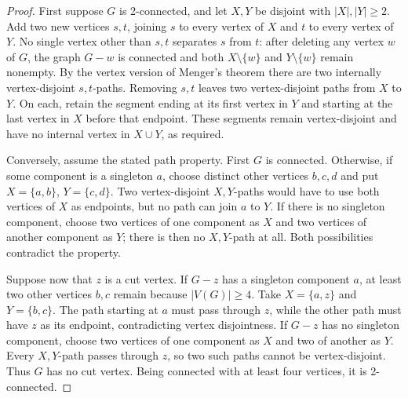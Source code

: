 \documentclass[12pt]{amsart}
\theoremstyle{conjecture}
\theoremstyle{definition}
\theoremstyle{question}
\theoremstyle{theorem}
\begin{document}
    \begin{proof}

        First suppose $G$ is 2-connected, and let $X,Y$ be disjoint
        with $|X|,|Y|\ge2$. Add two new vertices $s,t$, joining $s$
        to every vertex of $X$ and $t$ to every vertex of $Y$.
        No single vertex other than $s,t$ separates $s$ from $t$:
        after deleting any vertex $w$ of $G$, the graph $G-w$ is
        connected and both $X\setminus\{w\}$ and
        $Y\setminus\{w\}$ remain nonempty. By the vertex version of
        Menger's theorem there are two internally vertex-disjoint
        $s,t$-paths. Removing $s,t$ leaves two vertex-disjoint paths
        from $X$ to $Y$. On each, retain the segment ending at its
        first vertex in $Y$ and starting at the last vertex in $X$
        before that endpoint. These segments remain vertex-disjoint
        and have no internal vertex in $X\cup Y$, as required.

        Conversely, assume the stated path property. First $G$ is
        connected. Otherwise, if some component is a singleton $a$,
        choose distinct other vertices $b,c,d$ and put
        $X=\{a,b\}$, $Y=\{c,d\}$. Two vertex-disjoint $X,Y$-paths
        would have to use both vertices of $X$ as endpoints, but no
        path can join $a$ to $Y$. If there is no singleton component,
        choose two vertices of one component as $X$ and two vertices
        of another component as $Y$; there is then no $X,Y$-path at all.
        Both possibilities contradict the property.

        Suppose now that $z$ is a cut vertex. If $G-z$ has a singleton
        component $a$, at least two other vertices $b,c$ remain because
        $|V(G)|\ge4$. Take $X=\{a,z\}$ and $Y=\{b,c\}$.
        The path starting at $a$ must pass through $z$, while the
        other path must have $z$ as its endpoint, contradicting vertex
        disjointness. If $G-z$ has no singleton component, choose two
        vertices of one component as $X$ and two of another as $Y$.
        Every $X,Y$-path passes through $z$, so two such paths cannot
        be vertex-disjoint. Thus $G$ has no cut vertex. Being connected
        with at least four vertices, it is 2-connected.
    \end{proof}
\end{document}
